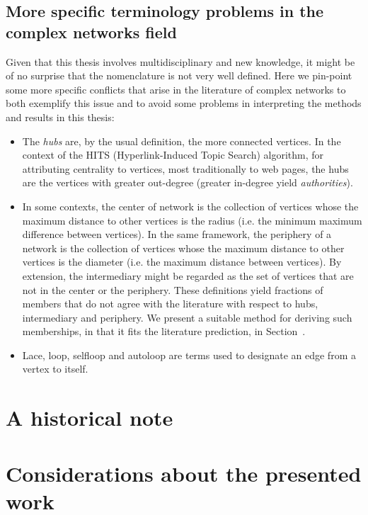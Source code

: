 \subsection{More specific terminology problems in the complex networks field}
Given that this thesis involves multidisciplinary and new knowledge,
it might be of no surprise that the nomenclature is not very well defined.
Here we pin-point some more specific conflicts that arise in the literature of complex networks
to both exemplify this issue and to avoid some problems in interpreting the
methods and results in this thesis:
\begin{itemize}
	\item The \emph{hubs} are, by the usual definition, the more connected vertices.
		In the context of the HITS (Hyperlink-Induced Topic Search) algorithm,
		for attributing centrality to vertices, most traditionally to web pages,
		the hubs are the vertices with greater out-degree
		(greater in-degree yield \emph{authorities}).
	\item In some contexts, the center of network is the collection of vertices whose the
		maximum distance to other vertices is the radius (i.e. the minimum maximum difference between vertices). 
		In the same framework, the periphery of a network is the collection of vertices whose
		the maximum distance to other vertices is the diameter (i.e. the maximum distance between vertices).
		By extension, the intermediary might be regarded as the set of vertices that are not in the center or the periphery.
		These definitions yield fractions of members that do not agree with the literature with respect to hubs, intermediary and periphery.
		We present a suitable method for deriving such memberships, in that it fits the literature prediction, in Section~\label{sectioning}.
	\item Lace, loop, selfloop and autoloop are terms used to designate an edge from a vertex to itself.
\end{itemize}

\section{A historical note}

\section{Considerations about the presented work}

